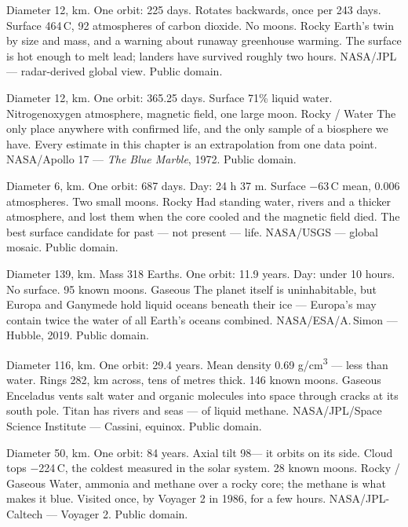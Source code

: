 {Diameter 12, km. One orbit: 225 days. Rotates backwards, once per 243 days.
Surface 464\,\textdegree C, 92 atmospheres of carbon dioxide. No moons.}
{Rocky}
{Earth's twin by size and mass, and a warning about runaway greenhouse warming. The
surface is hot enough to melt lead; landers have survived roughly two hours.}
{NASA/JPL --- radar-derived global view. Public domain.}

{Diameter 12, km. One orbit: 365.25 days. Surface 71\% liquid water. Nitrogen\ndash{}oxygen
atmosphere, magnetic field, one large moon.}
{Rocky / Water}
{The only place anywhere with confirmed life, and the only sample of a biosphere we have.
Every estimate in this chapter is an extrapolation from one data point.}
{NASA/Apollo 17 --- \emph{The Blue Marble}, 1972. Public domain.}

{Diameter 6, km. One orbit: 687 days. Day: 24 h 37 m. Surface $-$63\,\textdegree C mean,
0.006 atmospheres. Two small moons.}
{Rocky}
{Had standing water, rivers and a thicker atmosphere, and lost them when the core cooled and
the magnetic field died. The best surface candidate for past --- not present --- life.}
{NASA/USGS --- global mosaic. Public domain.}

{Diameter 139, km. Mass 318 Earths. One orbit: 11.9 years. Day: under 10 hours.
No surface. 95 known moons.}
{Gaseous}
{The planet itself is uninhabitable, but Europa and Ganymede hold liquid oceans beneath their
ice --- Europa's may contain twice the water of all Earth's oceans combined.}
{NASA/ESA/A.\,Simon --- Hubble, 2019. Public domain.}

{Diameter 116, km. One orbit: 29.4 years. Mean density 0.69 g/cm\textsuperscript{3} ---
less than water. Rings 282, km across, tens of metres thick. 146 known moons.}
{Gaseous}
{Enceladus vents salt water and organic molecules into space through cracks at its south pole.
Titan has rivers and seas --- of liquid methane.}
{NASA/JPL/Space Science Institute --- Cassini, equinox. Public domain.}

{Diameter 50, km. One orbit: 84 years. Axial tilt 98\textdegree --- it orbits on its side.
Cloud tops $-$224\,\textdegree C, the coldest measured in the solar system. 28 known moons.}
{Rocky / Gaseous}
{Water, ammonia and methane over a rocky core; the methane is what makes it blue. Visited
once, by Voyager 2 in 1986, for a few hours.}
{NASA/JPL-Caltech --- Voyager 2. Public domain.}

